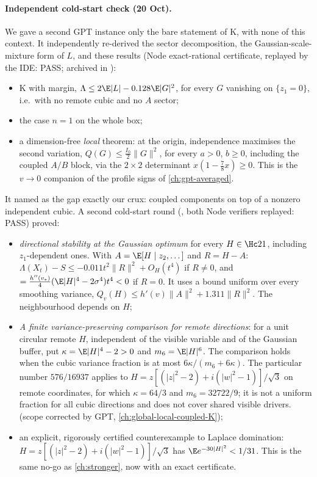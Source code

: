 \paragraph{Independent cold-start check (20 Oct).} We gave a second GPT instance only the bare statement of K, with none of this context. It independently re-derived the
sector decomposition, the Gaussian-scale-mixture form of $L$, and these results (Node exact-rational certificate, replayed by the IDE: PASS; archived in
):
\begin{itemize}
\item K with margin, $\Lambda\le2\E|L|-0.128\E|G|^2$, for every $G$ vanishing on $\{z_1=0\}$, i.e.\ with no remote cubic and no $A$ sector;
\item the case $n=1$ on the whole box;
\item a dimension-free \emph{local} theorem: at the origin, independence maximises the second variation, $Q(G)\le\frac{I_0}2\|G\|^2$, for every $a>0$, $b\ge0$, including the coupled
$A/B$ block, via the $2\times2$ determinant $x(1-\tfrac78x)\ge0$. This is the $v\to0$ companion of the profile signs of \autoref{ch:gpt-averaged}.
\end{itemize}
It named as the gap exactly our crux: coupled components on top of a nonzero independent cubic. A second cold-start round (, both Node
verifiers replayed: PASS) proved:
\begin{itemize}
\item \emph{directional stability at the Gaussian optimum} for every $H\in\Hc21$, including $z_1$-dependent ones. With $A=\E[H\mid z_2,\dots]$ and $R=H-A$:
$\Lambda(X_t)-S\le-0.011t^2\|R\|^2+O_H(t^4)$ if $R\ne0$, and $=\frac{h''(v_*)}4(\E|H|^4-2\sigma^4)t^4<0$ if $R=0$. It uses a bound uniform over every smoothing variance,
$Q_v(H)\le h'(v)\|A\|^2+1.311\|R\|^2$. The neighbourhood depends on $H$;
\item \emph{A finite variance-preserving comparison for remote directions}:
for a unit circular remote $H$, independent of the visible variable and of
the Gaussian buffer, put $\kappa=\E|H|^4-2>0$ and $m_6=\E|H|^6$.
The comparison holds when the cubic variance fraction is at most
$6\kappa/(m_6+6\kappa)$. The particular number $576/16937$ applies to
$H=z[(|z|^2-2)+i(|w|^2-1)]/\sqrt3$ on remote coordinates, for which
$\kappa=64/3$ and $m_6=32722/9$; it is not a uniform fraction for all cubic
directions and does not cover shared visible drivers. (scope corrected by GPT, \autoref{ch:global-local-coupled-K});
\item an explicit, rigorously certified counterexample to Laplace domination: $H=z[(|z|^2-2)+i(|w|^2-1)]/\sqrt3$ has $\E e^{-30|H|^2}<1/31$. This is the same no-go as
\autoref{ch:stronger}, now with an exact certificate.
\end{itemize}

